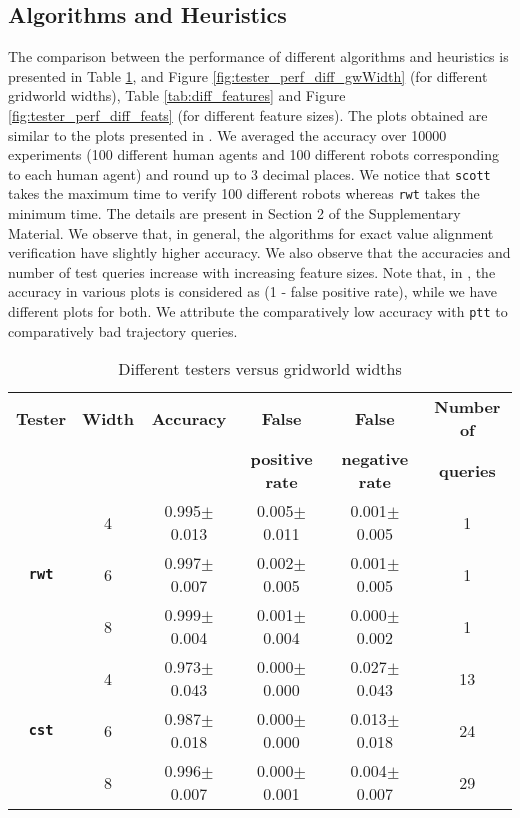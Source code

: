 \subsection{Algorithms and Heuristics}
\label{subsec:algorithms-and-heuristics}
The comparison between the performance of different algorithms and heuristics is presented in Table \ref{tab:diff_gwWidth}, and Figure \ref{fig:tester_perf_diff_gwWidth} (for different gridworld widths), Table \ref{tab:diff_features} and Figure \ref{fig:tester_perf_diff_feats} (for different feature sizes). The plots obtained are similar to the plots presented in \cite{brown2021value}. We averaged the accuracy over 10000 experiments (100 different human agents and 100 different robots corresponding to each human agent) and round up to 3 decimal places. We notice that \texttt{scott} takes the maximum time to verify 100 different robots whereas \texttt{rwt} takes the minimum time. The details are present in Section 2 of the Supplementary Material. We observe that, in general, the algorithms for exact value alignment verification have slightly higher accuracy. We also observe that the accuracies and number of test queries increase with increasing feature sizes. Note that, in \cite{brown2021value}, the accuracy in various plots is considered as (1 - false positive rate), while we have different plots for both. We attribute the comparatively low accuracy with \texttt{ptt} to comparatively bad trajectory queries. 

\begin{table}[!hbtp]
  \caption{Different testers versus gridworld widths}
  \label{tab:diff_gwWidth}
  \centering
  \begin{tabular}{cccccc}
    \toprule
    \textbf{Tester}& \textbf{Width}& \textbf{Accuracy} & \textbf{False} & \textbf{False } & \textbf{Number of} \\
    & & & \textbf{positive rate} & \textbf{negative rate} & \textbf{queries} \\
    \midrule
     & 4 & 0.995$\pm$0.013 & 0.005$\pm$0.011 & 0.001$\pm$0.005	& 1  \\
     \textbf{\texttt{rwt}} & 6 & 0.997$\pm$0.007&	0.002$\pm$0.005&	0.001$\pm$0.005&	1\\
     & 8 & 0.999$\pm$0.004&	0.001$\pm$0.004&	0.000$\pm$0.002&	1\\
     \midrule
     & 4 & 0.973$\pm$0.043&	0.000$\pm$0.000&	0.027$\pm$0.043&	13\\
     \textbf{\texttt{cst}}  & 6 & 0.987$\pm$0.018&	0.000$\pm$0.000&	0.013$\pm$0.018&	24\\
     & 8 & 0.996$\pm$0.007&	0.000$\pm$0.001&	0.004$\pm$0.007&	29\\
     \bottomrule
  \end{tabular}
\end{table}


